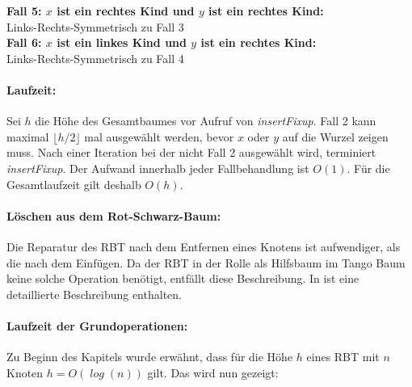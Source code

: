 \documentclass[a4paper,12pt]{article}
\begin{document}
\noindent\textbf{Fall 5: $x$ ist ein rechtes Kind und $y$ ist ein rechtes Kind: }\\ 
Links-Rechts-Symmetrisch zu Fall 3\\
\noindent\textbf{Fall 6: $x$ ist ein linkes Kind und $y$ ist ein rechtes Kind: }\\ 
Links-Rechts-Symmetrisch zu Fall 4\\


\paragraph{Laufzeit:}
\noindent  Sei $h$ die Höhe des Gesamtbaumes vor Aufruf von \textit{insertFixup}. Fall 2 kann maximal $\lfloor h / 2\rfloor$ mal ausgewählt werden, bevor $x$ oder $y$ auf die Wurzel zeigen muss. Nach einer Iteration bei der nicht Fall 2 ausgewählt wird, terminiert \textit{insertFixup}. Der Aufwand innerhalb jeder Fallbehandlung ist $O(1)$. Für die Gesamtlaufzeit gilt deshalb $\mathit{O(h)}$.


  
\paragraph{Löschen aus dem Rot-Schwarz-Baum:}
Die Reparatur des RBT nach dem Entfernen eines Knotens ist aufwendiger, als die nach dem Einfügen. Da der RBT in der Rolle als Hilfsbaum im Tango Baum keine solche Operation benötigt, entfällt diese Beschreibung. In \cite{algEinf} ist eine detaillierte Beschreibung enthalten. 
\paragraph{Laufzeit der Grundoperationen:}
Zu Beginn des Kapitels wurde erwähnt, dass für die Höhe $h$ eines RBT mit $n$ Knoten $h = \mathit{O(\log {\left(n\right)})}$  gilt. Das wird nun gezeigt:
\end{document}
